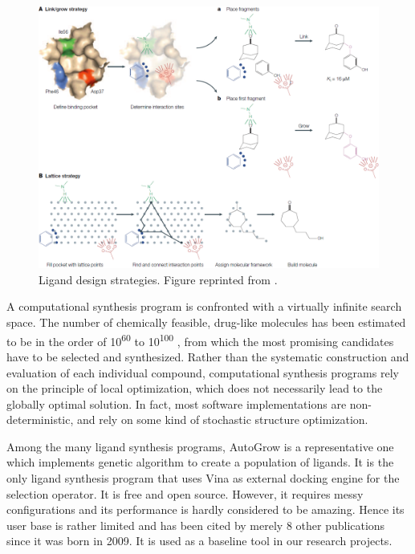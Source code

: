 \begin{figure}[t]
\centering
\includegraphics[width=\textwidth]{igrow/LigandDesign.png}
\caption{Ligand design strategies. Figure reprinted from \citep{363}.}
\label{igrow:LigandDesign}
\end{figure}

A computational synthesis program is confronted with a virtually infinite search space. The number of chemically feasible, drug-like molecules has been estimated to be in the order of 10\textsuperscript{60} to 10\textsuperscript{100} \citep{363}, from which the most promising candidates have to be selected and synthesized. Rather than the systematic construction and evaluation of each individual compound, computational synthesis programs rely on the principle of local optimization, which does not necessarily lead to the globally optimal solution. In fact, most software implementations \citep{466,749} are non-deterministic, and rely on some kind of stochastic structure optimization.

Among the many ligand synthesis programs, AutoGrow \citep{466} is a representative one which implements genetic algorithm to create a population of ligands. It is the only ligand synthesis program that uses Vina \citep{595} as external docking engine for the selection operator. It is free and open source. However, it requires messy configurations and its performance is hardly considered to be amazing. Hence its user base is rather limited and has been cited by merely 8 other publications since it was born in 2009. It is used as a baseline tool in our research projects.

